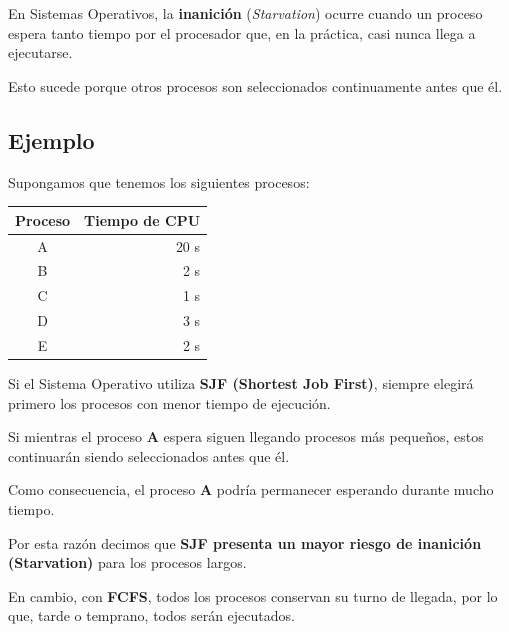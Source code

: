 \documentclass[
  spanish,
  letterpaper,
]{scrbook}
\newcounter{none} %
\begin{document}
\begin{tcolorbox}[enhanced jigsaw, arc=.35mm, bottomrule=.15mm, bottomtitle=1mm, breakable, colback=white, colbacktitle=quarto-callout-note-color!10!white, colframe=quarto-callout-note-color-frame, coltitle=black, left=2mm, leftrule=.75mm, opacityback=0, opacitybacktitle=0.6, rightrule=.15mm, title=\textcolor{quarto-callout-note-color}{\faInfo}\hspace{0.5em}{¿Qué significa el riesgo de inanición (Starvation)?}, titlerule=0mm, toprule=.15mm, toptitle=1mm]

En Sistemas Operativos, la \textbf{inanición} (\emph{Starvation}) ocurre
cuando un proceso espera tanto tiempo por el procesador que, en la
práctica, casi nunca llega a ejecutarse.

Esto sucede porque otros procesos son seleccionados continuamente antes
que él.

\subsection{Ejemplo}\label{ejemplo-3}

Supongamos que tenemos los siguientes procesos:

{\def\LTcaptype{none} %
\begin{longtable}[]{@{}cr@{}}
\toprule\noalign{}
Proceso & Tiempo de CPU \\
\midrule\noalign{}
\endhead
\bottomrule\noalign{}
\endlastfoot
A & 20 s \\
B & 2 s \\
C & 1 s \\
D & 3 s \\
E & 2 s \\
\end{longtable}
}

Si el Sistema Operativo utiliza \textbf{SJF (Shortest Job First)},
siempre elegirá primero los procesos con menor tiempo de ejecución.

Si mientras el proceso \textbf{A} espera siguen llegando procesos más
pequeños, estos continuarán siendo seleccionados antes que él.

Como consecuencia, el proceso \textbf{A} podría permanecer esperando
durante mucho tiempo.

Por esta razón decimos que \textbf{SJF presenta un mayor riesgo de
inanición (Starvation)} para los procesos largos.

En cambio, con \textbf{FCFS}, todos los procesos conservan su turno de
llegada, por lo que, tarde o temprano, todos serán ejecutados.

\end{tcolorbox}
\end{document}
